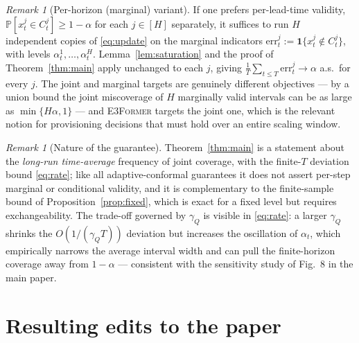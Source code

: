 \documentclass[11pt]{article}
\theoremstyle{definition}
\theoremstyle{remark}
\newtheorem{remark}[theorem]{Remark}
\newcommand{\PR}{\mathbb{P}}
\newcommand{\ind}{\mathbf{1}}
\newcommand{\err}{\mathrm{err}}
\newcommand{\horizon}{[H]}
\begin{document}
\begin{remark}[Per-horizon (marginal) variant]
\label{rem:perstep}
If one prefers per-lead-time validity, $\PR[x_t^{j}\in C_t^{j}]\ge1-\alpha$ for
each $j\in\horizon$ separately, it suffices to run $H$ independent copies of
\eqref{eq:update} on the marginal indicators
$\err_t^{j}:=\ind\{x_t^{j}\notin C_t^{j}\}$, with levels
$\alpha_t^{1},\dots,\alpha_t^{H}$. Lemma~\ref{lem:saturation} and the proof of
Theorem~\ref{thm:main} apply unchanged to each $j$, giving
$\frac{1}{T}\sum_{t\le T}\err_t^{j}\to\alpha$ a.s.\ for every $j$. The joint
and marginal targets are genuinely different objectives --- by a union bound the
joint miscoverage of $H$ marginally valid intervals can be as large as
$\min\{H\alpha,1\}$ --- and \textsc{E3Former} targets the joint one, which is
the relevant notion for provisioning decisions that must hold over an entire
scaling window.
\end{remark}

\begin{remark}[Nature of the guarantee]
\label{rem:nature}
Theorem~\ref{thm:main} is a statement about the \emph{long-run time-average}
frequency of joint coverage, with the finite-$T$ deviation bound
\eqref{eq:rate}; like all adaptive-conformal guarantees
\cite{gibbs2021} it does not assert per-step marginal or conditional validity,
and it is
complementary to the finite-sample bound of Proposition~\ref{prop:fixed},
which is exact for a fixed level but requires exchangeability. The trade-off
governed by $\gamma_Q$ is visible in \eqref{eq:rate}: a larger $\gamma_Q$
shrinks the $O(1/(\gamma_Q T))$ deviation but increases the oscillation of
$\alpha_t$, which empirically narrows the average interval width and can pull
the finite-horizon coverage away from $1-\alpha$ --- consistent with the
sensitivity study of Fig.~8 in the main paper.
\end{remark}

\section{Resulting edits to the paper}
\label{sec:edits}
\end{document}
